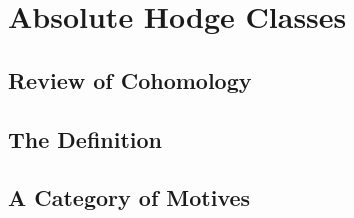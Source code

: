 \documentclass[../thesis.tex]{subfiles}
\begin{document}
\chapter{Absolute Hodge Classes} \label{chap:abs-hodge}

\section{Review of Cohomology} \label{sec:review-cohom}

\section{The Definition}
\begin{theorem}[Principle B] \label{thm:principle-b}
	
\end{theorem}

\section{A Category of Motives}
\end{document}
